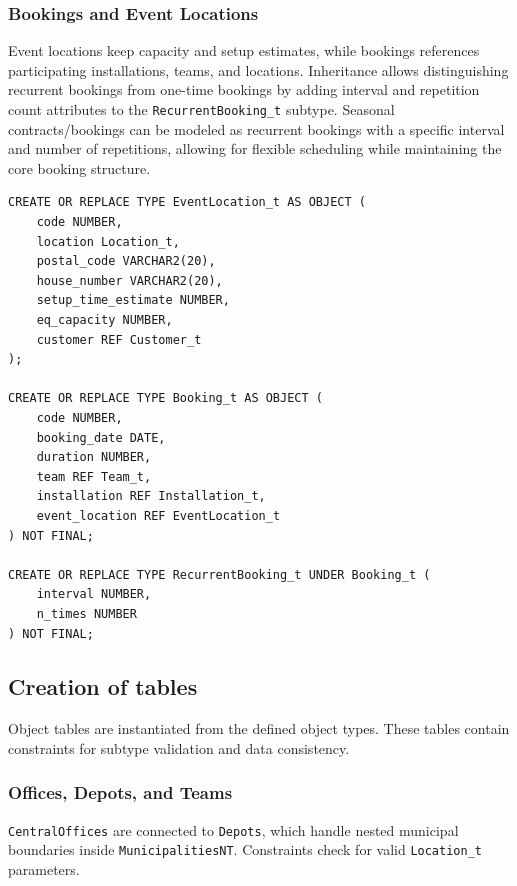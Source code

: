 \subsubsection{Bookings and Event Locations}
Event locations keep capacity and setup estimates, while bookings references participating installations, teams, and locations. Inheritance allows distinguishing recurrent bookings from one-time bookings by adding interval and repetition count attributes to the \texttt{RecurrentBooking\_t} subtype. Seasonal contracts/bookings can be modeled as recurrent bookings with a specific interval and number of repetitions, allowing for flexible scheduling while maintaining the core booking structure.

\begin{verbatim}
CREATE OR REPLACE TYPE EventLocation_t AS OBJECT (
    code NUMBER,
    location Location_t, 
    postal_code VARCHAR2(20), 
    house_number VARCHAR2(20),
    setup_time_estimate NUMBER, 
    eq_capacity NUMBER, 
    customer REF Customer_t
);

CREATE OR REPLACE TYPE Booking_t AS OBJECT (
    code NUMBER,
    booking_date DATE, 
    duration NUMBER, 
    team REF Team_t, 
    installation REF Installation_t, 
    event_location REF EventLocation_t
) NOT FINAL;

CREATE OR REPLACE TYPE RecurrentBooking_t UNDER Booking_t (
    interval NUMBER, 
    n_times NUMBER
) NOT FINAL;
\end{verbatim}

\subsection{Creation of tables}

Object tables are instantiated from the defined object types. These tables contain constraints for subtype validation and data consistency.

\subsubsection{Offices, Depots, and Teams}
\texttt{CentralOffices} are connected to \texttt{Depots}, which handle nested municipal boundaries inside \texttt{MunicipalitiesNT}. Constraints check for valid \texttt{Location\_t} parameters.

